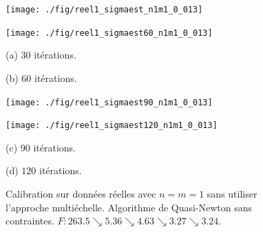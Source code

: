\begin{figure}[!htbp]

\begin{center}
\begin{minipage}{5.8cm}
\centerline{\texttt{[image: ./fig/reel1\_sigmaest\_n1m1\_0\_013]}
} 
\end{minipage}
\hspace*{0.1cm}
\begin{minipage}{5.8cm}
\centerline{\texttt{[image: ./fig/reel1\_sigmaest60\_n1m1\_0\_013]}
}
\end{minipage}
\end{center}

\begin{center}
\begin{minipage}{5.8cm}
(a) $30$ it\'erations.
\end{minipage}
\hspace*{0.1cm}
\begin{minipage}{5.8cm}
(b) $60$ it\'erations.
\end{minipage}
\end{center}

\medskip

\begin{center}
\begin{minipage}{5.8cm}
\centerline{\texttt{[image: ./fig/reel1\_sigmaest90\_n1m1\_0\_013]}
}
\end{minipage}
\hspace*{0.1cm}
\begin{minipage}{5.8cm}
\centerline{\texttt{[image: ./fig/reel1\_sigmaest120\_n1m1\_0\_013]}
}
\end{minipage}
\end{center}

\begin{center}
\begin{minipage}{5.8cm}
(c) $90$ it\'erations.
\end{minipage}
\hspace*{0.1cm}
\begin{minipage}{5.8cm}
(d) $120$ it\'erations.
\end{minipage}
\end{center}

\caption{Calibration sur donn\'ees r\'eelles avec $n = m = 1$ sans 
utiliser l'approche multi\'echelle. Algorithme de Quasi-Newton 
sans contraintes. \newline
$F : 263.5 \searrow 5.36 \searrow 4.63 
\searrow 3.27 \searrow 3.24$.
}
\label{FIG:REEL1_SANS}
\end{figure}

